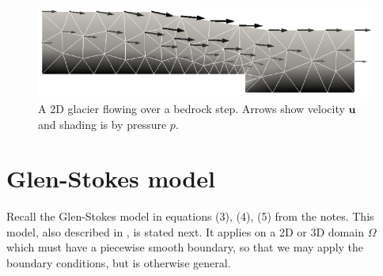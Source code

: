 \documentclass[letterpaper,final,12pt,reqno]{amsart}
\newcommand{\bu}{\mathbf{u}}
\begin{document}
\begin{figure}[h]
\includegraphics[width=\textwidth,angle=-5.7296]{stepflowlin}  %
\caption{A 2D glacier flowing over a bedrock step.  Arrows show velocity $\bu$ and shading is by pressure $p$.}
\label{fig:glacier}
\end{figure}


\section{Glen-Stokes model} \label{sec:stokes}

Recall the Glen-Stokes model in equations (3), (4), (5) from the notes.  This model, also described in \cite{GreveBlatter2009,JouvetRappaz2011}, is stated next.  It applies on a 2D or 3D domain $\Omega$ which must have a piecewise smooth boundary, so that we may apply the boundary conditions, but is otherwise general.
\end{document}
